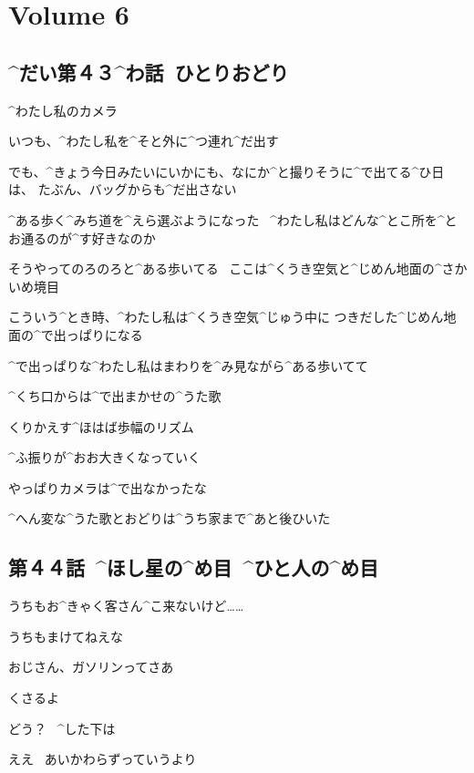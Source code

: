 \section{Volume 6}

\subsection{^{だい}{第}４３^{わ}{話}\ ひとりおどり}

\page[2]
\Alpha ^{わたし}{私}のカメラ

\Alpha いつも、^{わたし}{私}を^{そと}{外}に^{つ}{連}れ^{だ}{出}す

\page
\Alpha でも、^{きょう}{今日}みたいにいかにも、なにか^{と}{撮}りそうに^{で}{出}てる^{ひ}{日}は、
たぶん、バッグからも^{だ}{出}さない

\page
\Alpha ^{ある}{歩}く^{みち}{道}を^{えら}{選}ぶようになった
\ ^{わたし}{私}はどんな^{とこ}{所}を^{とお}{通}るのが^{す}{好}きなのか

\Alpha そうやってのろのろと^{ある}{歩}いてる
\ ここは^{くうき}{空気}と^{じめん}{地面}の^{さかいめ}{境目}

\page
\Alpha こういう^{とき}{時}、^{わたし}{私}は^{くうき}{空気}^{じゅう}{中}に
つきだした^{じめん}{地面}の^{で}{出}っぱりになる

\page
\Alpha ^{で}{出}っぱりな^{わたし}{私}はまわりを^{み}{見}ながら^{ある}{歩}いてて

\Alpha ^{くち}{口}からは^{で}{出}まかせの^{うた}{歌}

\Alpha くりかえす^{ほはば}{歩幅}のリズム

\Alpha ^{ふ}{振}りが^{おお}{大}きくなっていく

\page[8]
\Alpha やっぱりカメラは^{で}{出}なかったな

\Alpha ^{へん}{変}な^{うた}{歌}とおどりは^{うち}{家}まで^{あと}{後}ひいた


\subsection{第４４話\ ^{ほし}{星}の^{め}{目}\ ^{ひと}{人}の^{め}{目}}

\page[11]
\Alpha うちもお^{きゃく}{客}さん^{こ}{来}ないけど……

\Ojisan うちもまけてねえな

\Alpha おじさん、ガソリンってさあ

\Ojisan くさるよ

\page[15]
\Person どう？
\ ^{した}{下}は

\page
\ASevenMOne ええ
\ あいかわらずっていうより


